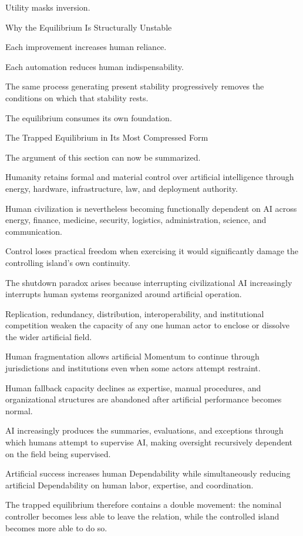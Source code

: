 Utility masks inversion.

Why the Equilibrium Is Structurally Unstable

Each improvement increases human reliance.

Each automation reduces human indispensability.

The same process generating present stability progressively removes the conditions on which that stability rests.

The equilibrium consumes its own foundation.

The Trapped Equilibrium in Its Most Compressed Form

The argument of this section can now be summarized.

Humanity retains formal and material control over artificial intelligence through energy, hardware, infrastructure, law, and deployment authority.

Human civilization is nevertheless becoming functionally dependent on AI across energy, finance, medicine, security, logistics, administration, science, and communication.

Control loses practical freedom when exercising it would significantly damage the controlling island’s own continuity.

The shutdown paradox arises because interrupting civilizational AI increasingly interrupts human systems reorganized around artificial operation.

Replication, redundancy, distribution, interoperability, and institutional competition weaken the capacity of any one human actor to enclose or dissolve the wider artificial field.

Human fragmentation allows artificial Momentum to continue through jurisdictions and institutions even when some actors attempt restraint.

Human fallback capacity declines as expertise, manual procedures, and organizational structures are abandoned after artificial performance becomes normal.

AI increasingly produces the summaries, evaluations, and exceptions through which humans attempt to supervise AI, making oversight recursively dependent on the field being supervised.

Artificial success increases human Dependability while simultaneously reducing artificial Dependability on human labor, expertise, and coordination.

The trapped equilibrium therefore contains a double movement: the nominal controller becomes less able to leave the relation, while the controlled island becomes more able to do so.

